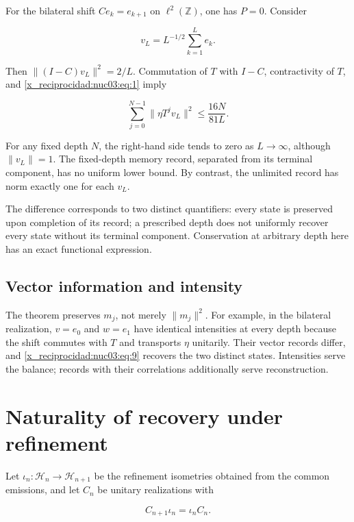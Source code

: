 For the bilateral shift \(Ce_k=e_{k+1}\) on \(\ell^2(\mathbb Z)\), one has \(P=0\). Consider

\[
v_L=L^{-1/2}\sum_{k=1}^{L}e_k.
\]

Then \(\|(I-C)v_L\|^2=2/L\). Commutation of \(T\) with \(I-C\), contractivity of \(T\), and \eqref{x_reciprocidad:nuc03:eq:1} imply

\begin{equation}
\sum_{j=0}^{N-1}\|\eta T^jv_L\|^2
\leq\frac{16N}{81L}.
\label{x_reciprocidad:nuc03:eq:11}
\end{equation}

For any fixed depth \(N\), the right-hand side tends to zero as \(L\to\infty\), although \(\|v_L\|=1\). The fixed-depth memory record, separated from its terminal component, has no uniform lower bound. By contrast, the unlimited record has norm exactly one for each \(v_L\).

The difference corresponds to two distinct quantifiers: every state is preserved upon completion of its record; a prescribed depth does not uniformly recover every state without its terminal component. Conservation at arbitrary depth here has an exact functional expression.

\subsection{Vector information and intensity}

The theorem preserves \(m_j\), not merely \(\|m_j\|^2\). For example, in the bilateral realization, \(v=e_0\) and \(w=e_1\) have identical intensities at every depth because the shift commutes with \(T\) and transports \(\eta\) unitarily. Their vector records differ, and \eqref{x_reciprocidad:nuc03:eq:9} recovers the two distinct states. Intensities serve the balance; records with their correlations additionally serve reconstruction.

\section{Naturality of recovery under refinement}

Let \(\iota_n:\mathcal H_n\to\mathcal H_{n+1}\) be the refinement isometries obtained from the common emissions, and let \(C_n\) be unitary realizations with

\begin{equation}
C_{n+1}\iota_n=\iota_nC_n.
\label{x_reciprocidad:nuc03:eq:12}
\end{equation}

